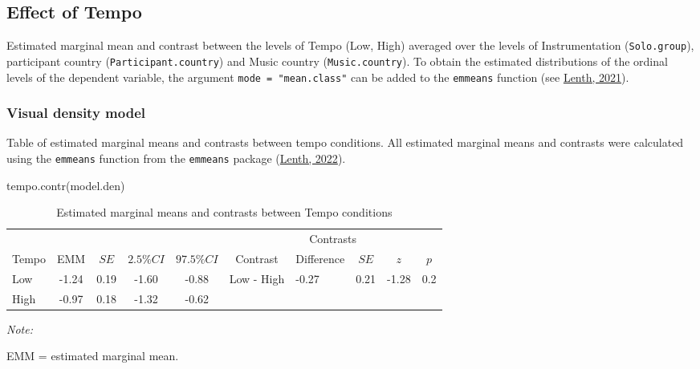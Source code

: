 \documentclass[
  bookmarksnumbered]{article}
\newenvironment{Shaded}{\begin{snugshade}}{\end{snugshade}}
\newcommand{\FunctionTok}[1]{\textcolor[rgb]{0.94,0.94,0.56}{#1}}
\newcommand{\NormalTok}[1]{\textcolor[rgb]{0.80,0.80,0.80}{#1}}
\begin{document}
\hypertarget{effect-of-tempo}{%
\subsection{Effect of Tempo}\label{effect-of-tempo}}

Estimated marginal mean and contrast between the levels of Tempo (Low, High) averaged over the levels of Instrumentation (\texttt{Solo.group}), participant country (\texttt{Participant.country}) and Music country (\texttt{Music.country}). To obtain the estimated distributions of the ordinal levels of the dependent variable, the argument \texttt{mode\ =\ "mean.class"} can be added to the \texttt{emmeans} function (see \protect\hyperlink{ref-532079}{Lenth, 2021}).

\hypertarget{visual-density-model}{%
\subsubsection{Visual density model}\label{visual-density-model}}

Table of estimated marginal means and contrasts between tempo conditions. All estimated marginal means and contrasts were calculated using the \texttt{emmeans} function from the \texttt{emmeans} package (\protect\hyperlink{ref-emmeanscit}{Lenth, 2022}).

\begin{Shaded}
\begin{Highlighting}[]
\FunctionTok{tempo.contr}\NormalTok{(model.den)}
\end{Highlighting}
\end{Shaded}

\begin{table}[H]

\caption{\label{tab:tab-den-emms}Estimated marginal means and contrasts between Tempo conditions}
\centering
\begin{threeparttable}
\begin{tabular}[t]{lccccclccc}
\toprule
\multicolumn{5}{c}{ } & \multicolumn{5}{c}{Contrasts} \\
\cmidrule(l{3pt}r{3pt}){6-10}
Tempo & EMM & $SE$ & $2.5\% CI$ & $97.5\% CI$ & Contrast & Difference & $SE$ & $z$ & $p$\\
\midrule
Low & -1.24 & 0.19 & -1.60 & -0.88 & Low - High & -0.27 & 0.21 & -1.28 & 0.2\\
High & -0.97 & 0.18 & -1.32 & -0.62 &  &  &  &  & \\
\bottomrule
\end{tabular}
\begin{tablenotes}[para]
\item \textit{Note: } 
\item EMM = estimated marginal mean.
\end{tablenotes}
\end{threeparttable}
\end{table}
\end{document}
